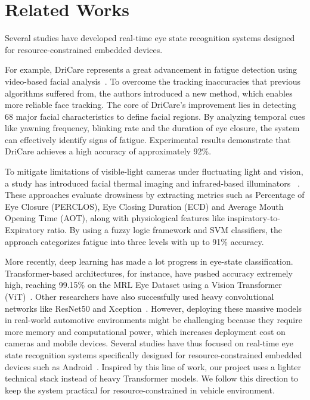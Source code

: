 \documentclass[10pt,twocolumn,letterpaper]{article}
\begin{document}
\section{Related Works}

Several studies have developed real-time eye state recognition systems designed for resource-constrained embedded devices. 

For example, DriCare represents a great advancement in fatigue detection using video-based facial analysis~\cite{8808931}. To overcome the tracking inaccuracies that previous algorithms suffered from, 
the authors introduced a new method, which enables more reliable face tracking. The core of DriCare's improvement lies in detecting 68 major facial characteristics to define facial regions. 
By analyzing temporal cues like yawning frequency, blinking rate and the duration of eye closure, the system can effectively identify signs of fatigue. 
Experimental results demonstrate that DriCare achieves a high accuracy of approximately 92\%.

To mitigate limitations of visible-light cameras under fluctuating light and vision, a study has introduced facial thermal imaging and infrared-based illuminators ~\cite{kiashari2020evaluation}. 
These approaches evaluate drowsiness by extracting metrics such as Percentage of Eye Closure (PERCLOS), Eye Closing Duration (ECD) and Average Mouth Opening Time (AOT), along with physiological features like inspiratory-to-Expiratory ratio. 
By using a fuzzy logic framework and SVM classifiers, the approach categorizes fatigue into three levels with up to 91\% accuracy.

More recently, deep learning has made a lot progress in eye-state classification. Transformer-based architectures, for instance, have pushed accuracy extremely high, reaching 99.15\% on the MRL Eye Dataset using a Vision Transformer (ViT)~\cite{Hassan2025}. 
Other researchers have also successfully used heavy convolutional networks like ResNet50 and Xception~\cite{abd2023efficient}. 
However, deploying these massive models in real-world automotive environments might be challenging because they require more memory and computational power, which increases deployment cost on cameras and mobile devices. 
Several studies have thus focused on real-time eye state recognition systems specifically designed for resource-constrained embedded devices such as Android~\cite{jabbar2020driver}. Inspired by this line of work, our project uses a lighter technical stack instead of heavy Transformer models. We follow this direction to keep the system practical for resource-constrained in vehicle environment.
\end{document}
